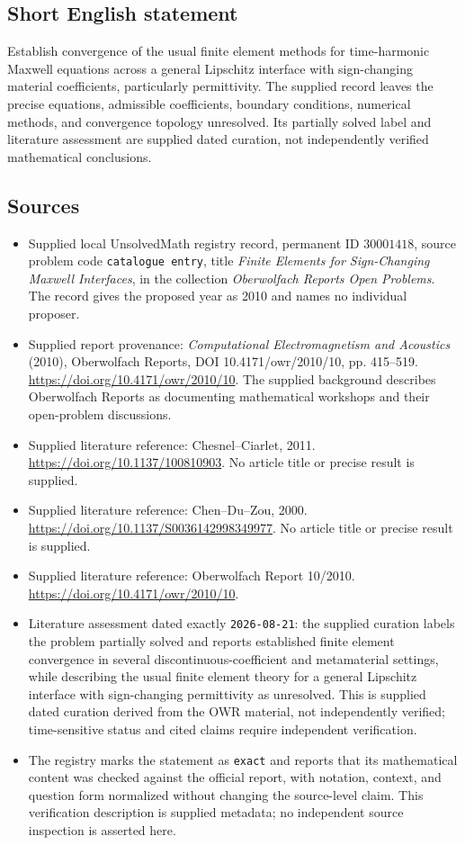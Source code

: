 \documentclass[11pt]{article}
\begin{document}
\subsection{Short English statement}
Establish convergence of the usual finite element methods for time-harmonic Maxwell equations across a general Lipschitz interface with sign-changing material coefficients, particularly permittivity. The supplied record leaves the precise equations, admissible coefficients, boundary conditions, numerical methods, and convergence topology unresolved. Its partially solved label and literature assessment are supplied dated curation, not independently verified mathematical conclusions.
\subsection{Sources}
\begin{itemize}
\item Supplied local UnsolvedMath registry record, permanent ID \(30001418\), source problem code \texttt{catalogue entry}, title \emph{Finite Elements for Sign-Changing Maxwell Interfaces}, in the collection \emph{Oberwolfach Reports Open Problems}. The record gives the proposed year as 2010 and names no individual proposer.
\item Supplied report provenance: \emph{Computational Electromagnetism and Acoustics} (2010), Oberwolfach Reports, DOI 10.4171/owr/2010/10, pp. 415--519. \url{https://doi.org/10.4171/owr/2010/10}. The supplied background describes Oberwolfach Reports as documenting mathematical workshops and their open-problem discussions.
\item Supplied literature reference: Chesnel--Ciarlet, 2011. \url{https://doi.org/10.1137/100810903}. No article title or precise result is supplied.
\item Supplied literature reference: Chen--Du--Zou, 2000. \url{https://doi.org/10.1137/S0036142998349977}. No article title or precise result is supplied.
\item Supplied literature reference: Oberwolfach Report 10/2010. \url{https://doi.org/10.4171/owr/2010/10}.
\item Literature assessment dated exactly \texttt{2026-08-21}: the supplied curation labels the problem partially solved and reports established finite element convergence in several discontinuous-coefficient and metamaterial settings, while describing the usual finite element theory for a general Lipschitz interface with sign-changing permittivity as unresolved. This is supplied dated curation derived from the OWR material, not independently verified; time-sensitive status and cited claims require independent verification.
\item The registry marks the statement as \texttt{exact} and reports that its mathematical content was checked against the official report, with notation, context, and question form normalized without changing the source-level claim. This verification description is supplied metadata; no independent source inspection is asserted here.
\end{itemize}
\end{document}
